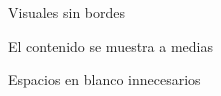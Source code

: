 {\begin{figure}[H]
\centering
 \caption{Visuales sin bordes}
 \label{fig:bordes} 
\end{figure}

\begin{figure}[H]
\centering
 \caption{El contenido se muestra a medias}
 \label{fig:tamano} 
\end{figure}

\begin{figure}[H]
\centering
 \caption{Espacios en blanco innecesarios}
 \label{fig:inn} 
\end{figure}

}
